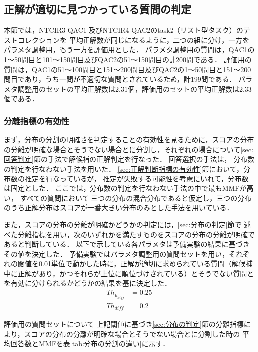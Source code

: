 \documentclass[japanese]{jnlp_1.4}
\begin{document}
\subsection{正解が適切に見つかっている質問の判定}\label{sec:問題判定}

本節では，NTCIR3 QAC1 \cite{Fukumoto:QAC1}及びNTCIR4 QAC2のtask2（リスト型タスク）\cite{Fukumoto:QAC2Subtask12}のテストコレクションを
平均正解数が同じになるように，二つの組に分け，一方をパラメタ調整用，もう一方を評価用とした．
パラメタ調整用の質問は，QAC1の1〜50問目と101〜150問目及びQAC2の51〜150問目の計200問である．
評価用の質問は，QAC1の51〜100問目と151〜200問目及びQAC2の1〜50問目と151〜200問目であり，うち一問が不適切な質問とされているため，計199問である．
パラメタ調整用のセットの平均正解数は2.31個，評価用のセットの平均正解数は2.33個である．


\subsubsection{分離指標の有効性}\label{sec:分離指標の有効性}

まず，分布の分割の明確さを判定することの有効性を見るために，スコアの分布の分離が明確な場合とそうでない場合とに分割し，それぞれの場合について\ref{sec:回答判定}節の手法で解候補の正解判定を行なった．
回答選択の手法は，
分布数の判定を行なわない手法を用いた．
\ref{sec:正解判断指標の有効性}節において，分布数の推定を行なっているが，
推定が失敗する可能性を考慮にいれて，分布数は固定とした．
ここでは，分布数の判定を行なわない手法の中で最もMMFが高い，
すべての質問において
三つの分布の混合分布であると仮定し，三つの分布のうち正解分布はスコアが一番大きい分布のみとした手法を用いている．

また，スコアの分布の分離が明確かどうかの判定には，\ref{sec:分布の判定}節で
述べた分離指標を用い，次のいずれかを満たすものをスコアの分布の分離が明確であると判断している．
以下で示している各パラメタは予備実験の結果に基づきその値を決定した．
予備実験ではパラメタ調整用の質問セットを用い，それぞれの閾値を0.01単位で動かした時に，正解が適切に求められている質問（解候補中に正解があり，かつそれらが上位に順位づけされている）とそうでない質問とを有効に分けられるかどうかの結果を基に決定した．
\begin{align}
Th_{\mu_{\mathit{diff}}} & = 0.25 \\
Th_{\mathit{diff}} & = 0.2
\end{align}

評価用の質問セットについて
上記閾値に基づき\ref{sec:分布の判定}節の分離指標により，スコアの分布の分離が明確な場合とそうでない場合とに分割した時の
平均回答数とMMFを表\ref{tab:分布の分割の違い}に示す．
\end{document}
